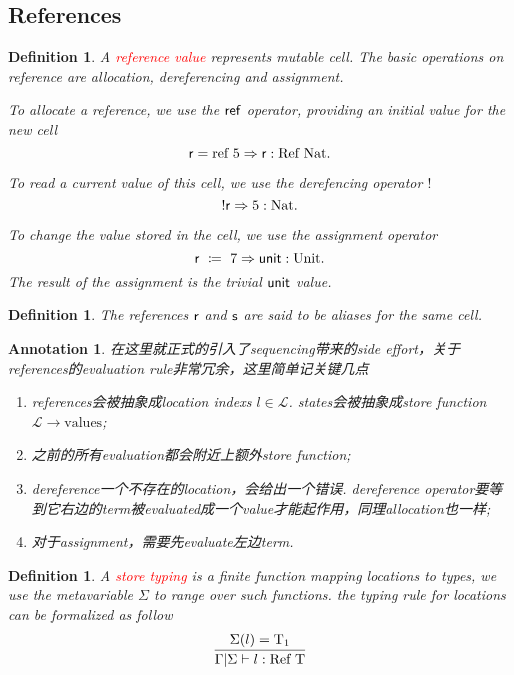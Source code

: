 \documentclass{article}
\theoremstyle{plain}
\newtheorem{definition}[theorem]{Definition}
\newtheorem{annotation}[theorem]{Annotation}
\theoremstyle{nonumberplain}
\newcommand{\assign}[2]{\ensuremath{#1~\coloneqq~#2}}
\newcommand{\singletype}[1]{\text{#1}}
\newcommand{\termtype}[2]{\ensuremath{#1:#2}}
\newcommand{\term}[1]{\ensuremath\mathsf{#1}}
\newcommand{\redt}[1]{\textcolor{red}{#1}}
\begin{document}
\newpage
\subsection{References}

\begin{definition}
\rm  A \redt{reference value} represents mutable cell. The basic operations on reference are allocation, dereferencing and assignment. 

To allocate a reference, we use the $\term{ref}$ operator, providing an initial value for the new cell
$$
\term{r} = \text{ref}~5 \Rightarrow \termtype{\term{r}}{\singletype{Ref}~\singletype{Nat}}. 
$$

To read a current value of this cell, we use the derefencing operator $!$
$$
!\term{r} \Rightarrow \termtype{5}{\singletype{Nat}}. 
$$ 


To change the value stored in the cell, we use the assignment operator
$$
\assign{\term{r}}{7} \Rightarrow \termtype{\term{unit}}{\singletype{Unit}}. 
$$
The result of the assignment is the trivial $\term{unit}$ value. 
\end{definition}

\begin{definition}
\rm The  references $\term{r}$ and $\term{s}$ are said to be aliases for the same cell. 
\end{definition}

\begin{annotation}
\rm 在这里就正式的引入了sequencing带来的side effort，关于references的evaluation rule非常冗余，这里简单记关键几点
\begin{enumerate}
	\item references会被抽象成location indexs $l \in \mathcal{L}$. states会被抽象成store function $\mathcal{L} \to \text{values}$;
	\item 之前的所有evaluation都会附近上额外store function;
	\item dereference一个不存在的location，会给出一个错误. dereference operator要等到它右边的term被evaluated成一个value才能起作用，同理allocation也一样;
	\item 对于assignment，需要先evaluate左边term. 
\end{enumerate}
\end{annotation}

\begin{definition}
\rm A \redt{store typing} is a finite function mapping locations to types, we use the metavariable $\Sigma$ to range over such functions. the typing rule for locations can be formalized as follow
$$
\infer{\Gamma | \Sigma \vdash \termtype{l}{\singletype{Ref}~\singletype{T}}}{\Sigma({l})=\singletype{T}_1}
$$
\end{definition}
\end{document}
